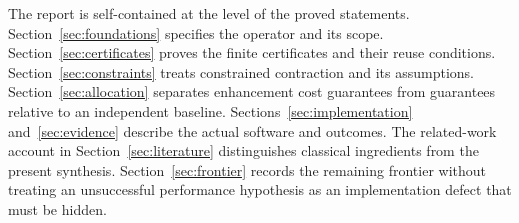 The report is self-contained at the level of the proved statements.
Section~\ref{sec:foundations} specifies the operator and its scope.
Section~\ref{sec:certificates} proves the finite certificates and their
reuse conditions. Section~\ref{sec:constraints} treats constrained
contraction and its assumptions. Section~\ref{sec:allocation} separates
enhancement cost guarantees from guarantees relative to an independent
baseline. Sections~\ref{sec:implementation} and~\ref{sec:evidence}
describe the actual software and outcomes. The related-work account
in Section~\ref{sec:literature} distinguishes classical ingredients from
the present synthesis. Section~\ref{sec:frontier} records the remaining
frontier without treating an unsuccessful performance hypothesis as an
implementation defect that must be hidden.
